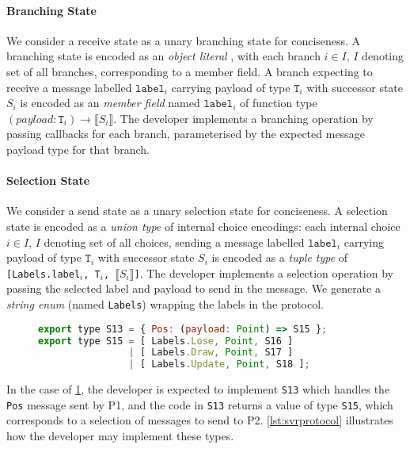\paragraph{Branching State}
We consider a receive state as a unary branching state for conciseness.
A branching state is encoded as an \textit{object literal}
\cite{TypeScriptSpec}, with each branch $i \in I$, $I$ denoting set of all
branches, corresponding to a member field.
A branch expecting to receive a message labelled $\texttt{label}_i$ carrying
payload of type $\texttt{T}_i$ with successor state $S_i$ is encoded as an
\textit{member field} named $\texttt{label}_i$ of function type
$(payload:\texttt{T}_i) \to \llbracket S_i \rrbracket$.
The developer implements a branching operation by passing callbacks for each
branch, parameterised by the expected message payload type for that branch.

\paragraph{Selection State}
We consider a send state as a unary selection state for conciseness.
A selection state is encoded as a \textit{union type}
\cite{TypeScriptSpec} of internal choice encodings: each internal choice $i \in
I$, $I$ denoting set of all choices, sending a message labelled
$\texttt{label}_i$ carrying payload of type $\texttt{T}_i$ with successor state
$S_i$ is encoded as a \textit{tuple type} of \texttt{[Labels.label$_i$, T$_i$,
  $\llbracket S_i \rrbracket$]}.
The developer implements a selection operation by passing the selected label
and payload to send in the message.
We generate a \textit{string enum} (named \texttt{Labels}) wrapping the labels
in the protocol.

\begin{figure}[ht]
\begin{lstlisting}[language=JavaScript]
export type S13 = { Pos: (payload: Point) => S15 };
export type S15 = [ Labels.Lose, Point, S16 ]
                | [ Labels.Draw, Point, S17 ]
                | [ Labels.Update, Point, S18 ];
\end{lstlisting}
\label{lst:svr}
\end{figure}

In the case of \cref{lst:svr}, the developer is expected to implement
\texttt{S13} which handles the \texttt{Pos} message sent by P1,
and the code in \texttt{S13} returns a value of type \texttt{S15}, which corresponds to a selection of messages to send to P2. \cref{lst:svrprotocol} illustrates how the developer may implement these types.


